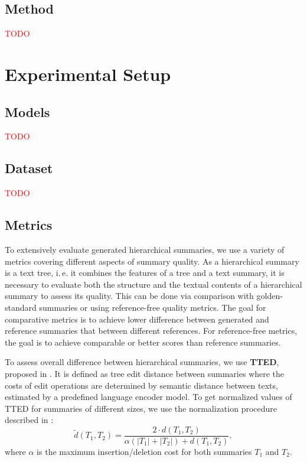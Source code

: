\documentclass[11pt,a4paper]{article}
\begin{document}
\subsection{Method}

\textcolor{Red}{TODO}


\section{Experimental Setup}

\subsection{Models}

\textcolor{Red}{TODO}

\subsection{Dataset}

\textcolor{Red}{TODO}

\subsection{Metrics}

To extensively evaluate generated hierarchical summaries, we use a variety of metrics covering different aspects of summary quality. As a hierarchical summary is a text tree, i.\,e. it combines the features of a tree and a text summary, it is necessary to evaluate both the structure and the textual contents of a hierarchical summary to assess its quality. This can be done via comparison with golden-standard summaries or using reference-free quality metrics. The goal for comparative metrics is to achieve lower difference between generated and reference summaries that between different references. For reference-free metrics, the goal is to achieve comparable or better scores than reference summaries.

To assess overall difference between hierarchical summaries, we use \textbf{TTED}, proposed in \cite{sobolevsky2025text}. It is defined as tree edit distance between summaries where the costs of edit operations are determined by semantic distance between texts, estimated by a predefined language encoder model. To get normalized values of TTED for summaries of different sizes, we use the normalization procedure described in \cite{li2011metric}:
\begin{equation}
    \tilde{d}(T_1, T_2) = \frac{2\cdot d(T_1, T_2)}{\alpha(|T_1| + |T_2|) + d(T_1, T_2)},
\end{equation}
where $\alpha$ is the maximum insertion/deletion cost for both summaries $T_1$ and $T_2$.
\end{document}
